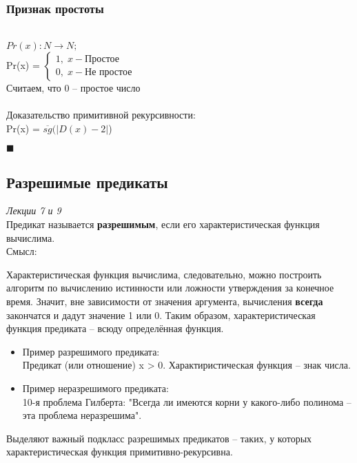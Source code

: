 \documentclass{article}
\begin{document}
\subsubsection{Признак простоты}\\
    $Pr(x): N \rightarrow N;$\\
    Pr(x) = 
    $\left\{ 
        \begin{aligned} 
        1,\; x - \text{Простое}\;\;\;\;\;\\
        0,\; x - \text{Не простое}
    \end{aligned}
    \right. $
    \\Считаем, что 0 -- простое число\\
    \\Доказательство примитивной рекурсивности:\\
    Pr(x) = $\overline{sg}(|D(x) - 2|$)
    \begin{flushright}
        $\blacksquare$
    \end{flushright}
        
        
     

\subsection{Разрешимые предикаты}
\emph{Лекции 7 и 9}\\

    Предикат называется \textbf{разрешимым}, если его характеристическая функция вычислима. \\
    
    Смысл:
        
        Характеристическая функция вычислима, следовательно, можно построить алгоритм по вычислению истинности или ложности утверждения за конечное время. Значит, вне зависимости от значения аргумента, вычисления \textbf{всегда} закончатся и дадут значение 1 или 0. Таким образом, характеристическая функция предиката -- всюду определённая функция.
    \begin{itemize}
        \item Пример разрешимого предиката:\\
                Предикат (или отношение) x > 0. Характиристическая функция -- знак числа.
        \item Пример неразрешимого предиката:\\
                10-я проблема Гилберта: "Всегда ли имеются корни у какого-либо полинома -- эта проблема неразрешима".
    \end{itemize}
    Выделяют важный подкласс разрешимых предикатов -- таких, у которых характеристическая функция примитивно-рекурсивна.
\end{document}
